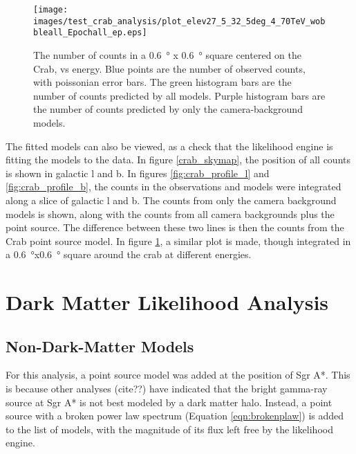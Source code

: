    \begin{figure}[h]
      \centering
      \texttt{[image: images/test\_crab\_analysis/plot\_elev27\_5\_32\_5deg\_4\_70TeV\_wobbleall\_Epochall\_ep.eps]}
      \caption[Crab Profile in Energy]
      {
        The number of counts in a \SI{0.6}{\degree} x \SI{0.6}{\degree} square centered on the Crab, vs energy.
        Blue points are the number of observed counts, with poissonian error bars.
        The green histogram bars are the number of counts predicted by all models.
        Purple histogram bars are the number of counts predicted by only the camera-background models.
      }
      \label{fig:crab_profile_energy}
    \end{figure}
    
    The fitted models can also be viewed, as a check that the likelihood engine is fitting the models to the data.
    In figure \ref{crab_skymap}, the position of all counts is shown in galactic l and b.
    In figures \ref{fig:crab_profile_l} and \ref{fig:crab_profile_b}, the counts in the observations and models were integrated along a slice of galactic l and b.
    The counts from only the camera background models is shown, along with the counts from all camera backgrounds plus the point source.
    The difference between these two lines is then the counts from the Crab point source model.
    In figure \ref{fig:crab_profile_energy}, a similar plot is made, though integrated in a \SI{0.6}{\degree}x\SI{0.6}{\degree} square around the crab at different energies.

\section{Dark Matter Likelihood Analysis}

  \subsection{Non-Dark-Matter Models}
  For this analysis, a point source model was added at the position of Sgr A*.
  This is because other analyses (cite??) have indicated that the bright gamma-ray source at Sgr A* is not best modeled by a dark matter halo.
  Instead, a point source with a broken power law spectrum (Equation \ref{eqn:brokenplaw}) is added to the list of models, with the magnitude of its flux left free by the likelihood engine.
  
